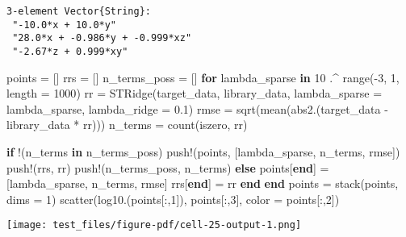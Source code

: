 \documentclass[
]{article}
\newenvironment{Shaded}{\begin{snugshade}}{\end{snugshade}}
\newcommand{\ControlFlowTok}[1]{\textcolor[rgb]{0.00,0.23,0.31}{\textbf{#1}}}
\newcommand{\FloatTok}[1]{\textcolor[rgb]{0.68,0.00,0.00}{#1}}
\newcommand{\FunctionTok}[1]{\textcolor[rgb]{0.28,0.35,0.67}{#1}}
\newcommand{\KeywordTok}[1]{\textcolor[rgb]{0.00,0.23,0.31}{\textbf{#1}}}
\newcommand{\NormalTok}[1]{\textcolor[rgb]{0.00,0.23,0.31}{#1}}
\newcommand{\OperatorTok}[1]{\textcolor[rgb]{0.37,0.37,0.37}{#1}}
\begin{document}
\begin{verbatim}
3-element Vector{String}:
 "-10.0*x + 10.0*y"
 "28.0*x + -0.986*y + -0.999*xz"
 "-2.67*z + 0.999*xy"
\end{verbatim}

\begin{Shaded}
\begin{Highlighting}[]
\NormalTok{points }\OperatorTok{=}\NormalTok{ []}
\NormalTok{rrs }\OperatorTok{=}\NormalTok{ []}
\NormalTok{n\_terms\_poss }\OperatorTok{=}\NormalTok{ []}
\ControlFlowTok{for}\NormalTok{ lambda\_sparse }\KeywordTok{in} \FloatTok{10} \OperatorTok{.\^{}} \FunctionTok{range}\NormalTok{(}\OperatorTok{{-}}\FloatTok{3}\NormalTok{, }\FloatTok{1}\NormalTok{, length }\OperatorTok{=} \FloatTok{1000}\NormalTok{)}
\NormalTok{  rr }\OperatorTok{=} \FunctionTok{STRidge}\NormalTok{(target\_data, library\_data, lambda\_sparse }\OperatorTok{=}\NormalTok{ lambda\_sparse, lambda\_ridge }\OperatorTok{=} \FloatTok{0.1}\NormalTok{)}
\NormalTok{  rmse }\OperatorTok{=} \FunctionTok{sqrt}\NormalTok{(}\FunctionTok{mean}\NormalTok{(}\FunctionTok{abs2}\NormalTok{.(target\_data }\OperatorTok{{-}}\NormalTok{ library\_data }\OperatorTok{*}\NormalTok{ rr)))}
\NormalTok{  n\_terms }\OperatorTok{=} \FunctionTok{count}\NormalTok{(iszero, rr)}

  \ControlFlowTok{if}\NormalTok{ !(n\_terms }\KeywordTok{in}\NormalTok{ n\_terms\_poss)}
    \FunctionTok{push!}\NormalTok{(points, [lambda\_sparse, n\_terms, rmse])}
    \FunctionTok{push!}\NormalTok{(rrs, rr)}
    \FunctionTok{push!}\NormalTok{(n\_terms\_poss, n\_terms)}
  \ControlFlowTok{else}
\NormalTok{    points[}\KeywordTok{end}\NormalTok{] }\OperatorTok{=}\NormalTok{ [lambda\_sparse, n\_terms, rmse]}
\NormalTok{    rrs[}\KeywordTok{end}\NormalTok{] }\OperatorTok{=}\NormalTok{ rr}
  \ControlFlowTok{end}
\ControlFlowTok{end}
\NormalTok{points }\OperatorTok{=} \FunctionTok{stack}\NormalTok{(points, dims }\OperatorTok{=} \FloatTok{1}\NormalTok{)}
\FunctionTok{scatter}\NormalTok{(}\FunctionTok{log10}\NormalTok{.(points[}\OperatorTok{:}\NormalTok{,}\FloatTok{1}\NormalTok{]), points[}\OperatorTok{:}\NormalTok{,}\FloatTok{3}\NormalTok{], color }\OperatorTok{=}\NormalTok{ points[}\OperatorTok{:}\NormalTok{,}\FloatTok{2}\NormalTok{])}
\end{Highlighting}
\end{Shaded}

\texttt{[image: test\_files/figure-pdf/cell-25-output-1.png]}
\end{document}
